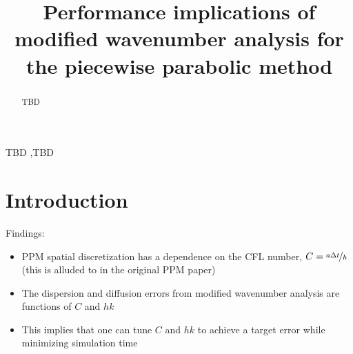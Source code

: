 \documentclass[review]{elsarticle}
\begin{document}
\begin{frontmatter}

\title{Performance implications of modified wavenumber analysis for the piecewise parabolic method}





\begin{abstract}
TBD
\end{abstract}

\begin{keyword}
TBD \sep TBD
\end{keyword}

\end{frontmatter}

\linenumbers

\section{Introduction}



Findings:
\begin{itemize}
\item PPM spatial discretization has a dependence on the CFL number, $C = \nicefrac{a\Delta t}{h}$ (this is alluded to in the original PPM paper)
\item The dispersion and diffusion errors from modified wavenumber analysis are functions of $C$ and $hk$
\item This implies that one can tune $C$ and $hk$ to achieve a target error while minimizing simulation time
\end{itemize}
\end{document}
